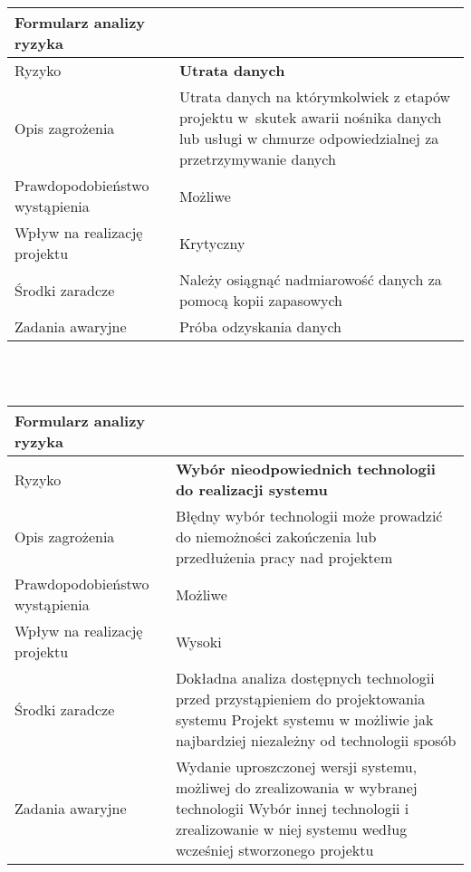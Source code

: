 \documentclass{article}
\begin{document}
{\def\arraystretch{1.3}\tabcolsep=10pt
\begin{tabular}{|L{6cm}|L{9cm}|}
\hline
Formularz analizy ryzyka &  \\
\hline
Ryzyko 						   & \textbf{Utrata danych} \\
\hline
Opis zagrożenia				   & Utrata danych na którymkolwiek z etapów projektu w~skutek awarii nośnika danych lub usługi w chmurze odpowiedzialnej za przetrzymywanie danych \\
\hline
Prawdopodobieństwo wystąpienia & Możliwe \\
\hline
Wpływ na realizację projektu   & Krytyczny \\
\hline
Środki zaradcze				   & Należy osiągnąć nadmiarowość danych za pomocą kopii zapasowych     \\
\hline
Zadania awaryjne			   & Próba odzyskania danych \\
\hline
\end{tabular}}

\mbox{}\\\mbox{}\\

{\def\arraystretch{1.3}\tabcolsep=10pt
\begin{tabular}{|L{6cm}|L{9cm}|}
\hline
Formularz analizy ryzyka &  \\
\hline
Ryzyko 						   & \textbf{Wybór nieodpowiednich technologii do realizacji systemu} \\
\hline
Opis zagrożenia				   & Błędny wybór technologii może prowadzić do niemożności zakończenia lub przedłużenia pracy nad projektem \\
\hline
Prawdopodobieństwo wystąpienia & Możliwe \\
\hline
Wpływ na realizację projektu   & Wysoki \\
\hline
Środki zaradcze				   & Dokładna analiza dostępnych technologii przed przystąpieniem do projektowania systemu
Projekt systemu w możliwie jak najbardziej niezależny od technologii sposób
 \\
\hline
Zadania awaryjne			   & Wydanie uproszczonej wersji systemu, możliwej do zrealizowania w wybranej technologii
Wybór innej technologii i zrealizowanie w niej systemu według wcześniej stworzonego projektu
 \\
\hline
\end{tabular}}

\mbox{}\\\mbox{}\\
\end{document}
